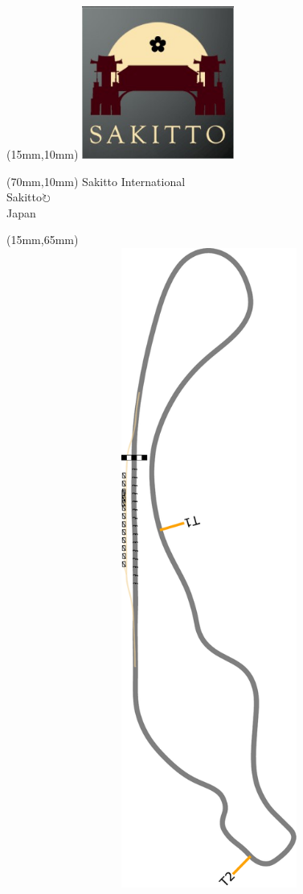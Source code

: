 \null\newpage
\begin{textblock*}{50mm}(15mm,10mm)%
\includegraphics[width=50mm]{LG/2015-05-20_00093.png}
\end{textblock*}
\begin{textblock*}{130mm}(70mm,10mm)%
{\fontsize{20}{20}\selectfont Sakitto International\\}
{\fontsize{16}{16}\selectfont Sakitto\hfill \Large$\circlearrowright$\\}
{\fontsize{12}{12}\selectfont Japan\\}
\end{textblock*}
\begin{textblock*}{185mm}(15mm,65mm)%
\centering
\mbox{\includegraphics[width=185mm,height=210mm,keepaspectratio]{PT/SAIN.pdf}}
\end{textblock*}
